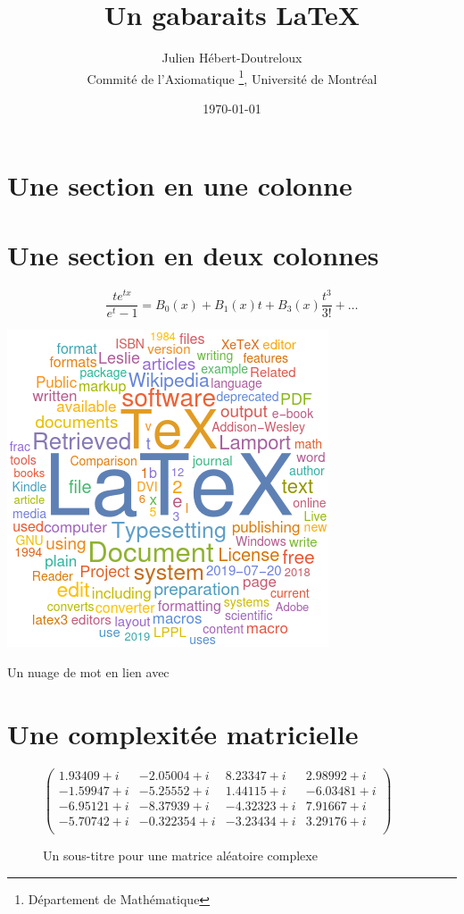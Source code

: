 \documentclass[french, babel]{article}
\title{Un gabaraits \LaTeX}
\author{Julien H\'ebert-Doutreloux\\%
	Commité de l'Axiomatique%
	\thanks{D\'epartement de Math\'ematique}, Université de Montréal}
\date{\today}
\begin{document}
	\maketitle
	\tableofcontents
	\vspace{1cm}
\section[Ce qui apparait dans la table des mati\`ere]{Une section en une colonne}
	\lipsum[3-5]
\section[D\'ebut d'article]{Une section en deux colonnes}
	\begin{multicols*}{2}
		\lipsum[5-7]
			\[\frac{te^{tx}}{e^t-1}=B_0(x)+B_1(x)t+B_3(x)\frac{t^3}{3!}+\dots\]
		\lipsum[7-7.5]
		\begin{center}
			\includegraphics[width=.3\textwidth]{WordCloudLaTeX}
			\caption{Un nuage de mot en lien avec \LaTeXe}
		\end{center}
	\lipsum[8-8.]
	\end{multicols*}
\section[Suite avec des tableaux]{Une complexit\'ee matricielle}
	\lipsum[8-9]
	\begin{figure}[ht]
	\centering
	$
	\left(
	\begin{array}{cccc}
		1.93409 + i & -2.05004+ i &
		8.23347 + i & 2.98992 + i \\
		-1.59947+ i & -5.25552+ i &
		1.44115 + i & -6.03481+ i \\
		-6.95121+ i & -8.37939+ i &
		-4.32323+ i & 7.91667 + i \\
		-5.70742+ i & -0.322354+i &
		-3.23434+ i & 3.29176 + i \\
	\end{array}
	\right)
	$
	\caption{Un sous-titre pour une matrice aléatoire complexe}
	\end{figure}
\end{document}
